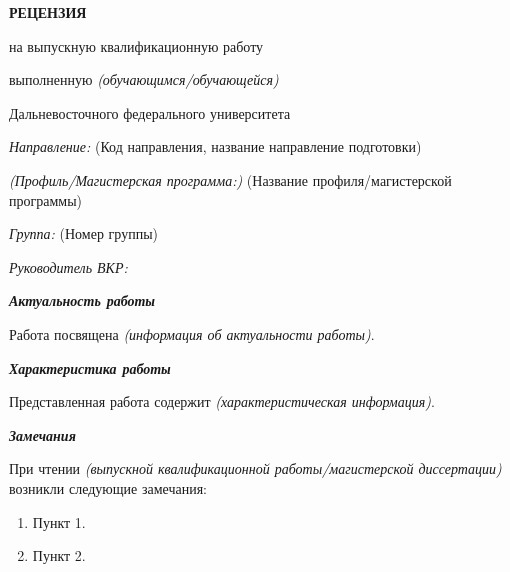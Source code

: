 \documentclass[12pt, a4paper, titlepage]{extarticle}
\begin{document}
	\drawtitle
	\pagestyle{empty}

	\vspace*{-10pt}

	\begin{center}

		\textbf{РЕЦЕНЗИЯ}

		\vspace*{-4pt}
		на выпускную квалификационную работу


		\vspace*{-4pt}
		выполненную \textit{(обучающимся/обучающейся)} 

		\vspace*{-4pt}
		Дальневосточного федерального университета

		\vspace{5pt}

	\end{center}

	\noindent \textit{Направление:} (Код направления, название направление подготовки)

	\noindent \textit{(Профиль/Магистерская программа:)} (Название профиля/магистерской программы)

	\noindent \textit{Группа:} (Номер группы)

	\noindent \textit{Руководитель ВКР:}  

	\textbf{\textit{Актуальность работы}}

		Работа посвящена \textit{(информация об актуальности работы)}.

	\textbf{\textit{Характеристика работы}}

		Представленная работа содержит \textit{(характеристическая информация)}.

	\textbf{\textit{Замечания}}

		При чтении \textit{(выпускной квалификационной работы/магистерской диссертации)} возникли следующие замечания:
		\begin{enumerate}
			\item Пункт 1.
			
			\item Пункт 2.
		\end{enumerate}
\end{document}
